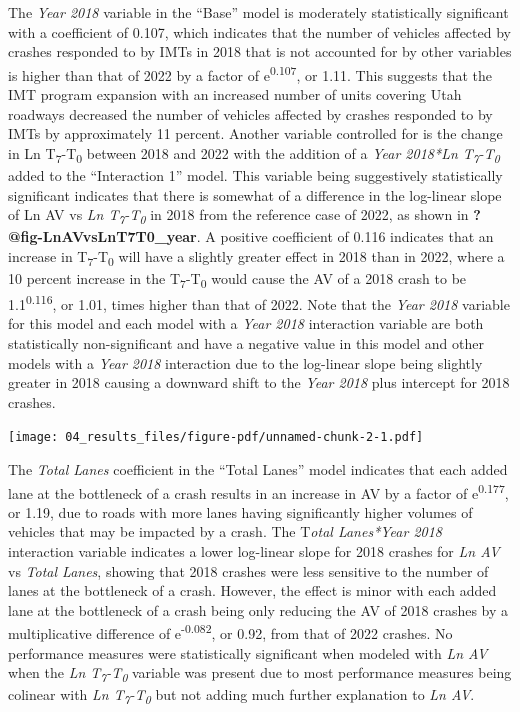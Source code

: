 \documentclass[
  letterpaper,
  authoryear]{elsarticle}
\begin{document}
The \emph{Year 2018} variable in the ``Base'' model is moderately
statistically significant with a coefficient of 0.107, which indicates
that the number of vehicles affected by crashes responded to by IMTs in
2018 that is not accounted for by other variables is higher than that of
2022 by a factor of e\textsuperscript{0.107}, or 1.11. This suggests
that the IMT program expansion with an increased number of units
covering Utah roadways decreased the number of vehicles affected by
crashes responded to by IMTs by approximately 11 percent. Another
variable controlled for is the change in Ln
T\textsubscript{7}-T\textsubscript{0} between 2018 and 2022 with the
addition of a \emph{Year 2018*Ln T\textsubscript{7}-T\textsubscript{0}}
added to the ``Interaction 1'' model. This variable being suggestively
statistically significant indicates that there is somewhat of a
difference in the log-linear slope of Ln AV vs \emph{Ln
T\textsubscript{7}-T\textsubscript{0}} in 2018 from the reference case
of 2022, as shown in \textbf{?@fig-LnAVvsLnT7T0\_year}. A positive
coefficient of 0.116 indicates that an increase in
T\textsubscript{7}-T\textsubscript{0} will have a slightly greater
effect in 2018 than in 2022, where a 10 percent increase in the
T\textsubscript{7}-T\textsubscript{0} would cause the AV of a 2018 crash
to be 1.1\textsuperscript{0.116}, or 1.01, times higher than that of
2022. Note that the \emph{Year 2018} variable for this model and each
model with a \emph{Year 2018} interaction variable are both
statistically non-significant and have a negative value in this model
and other models with a \emph{Year 2018} interaction due to the
log-linear slope being slightly greater in 2018 causing a downward shift
to the \emph{Year 2018} plus intercept for 2018 crashes.

\texttt{[image: 04\_results\_files/figure-pdf/unnamed-chunk-2-1.pdf]}

The \emph{Total Lanes} coefficient in the ``Total Lanes'' model
indicates that each added lane at the bottleneck of a crash results in
an increase in AV by a factor of e\textsuperscript{0.177}, or 1.19, due
to roads with more lanes having significantly higher volumes of vehicles
that may be impacted by a crash. The T\emph{otal Lanes*Year 2018}
interaction variable indicates a lower log-linear slope for 2018 crashes
for \emph{Ln AV} vs \emph{Total Lanes}, showing that 2018 crashes were
less sensitive to the number of lanes at the bottleneck of a crash.
However, the effect is minor with each added lane at the bottleneck of a
crash being only reducing the AV of 2018 crashes by a multiplicative
difference of e\textsuperscript{-0.082}, or 0.92, from that of 2022
crashes. No performance measures were statistically significant when
modeled with \emph{Ln AV} when the \emph{Ln
T\textsubscript{7}-T\textsubscript{0}} variable was present due to most
performance measures being colinear with \emph{Ln
T\textsubscript{7}-T\textsubscript{0}} but not adding much further
explanation to \emph{Ln AV}.
\end{document}
